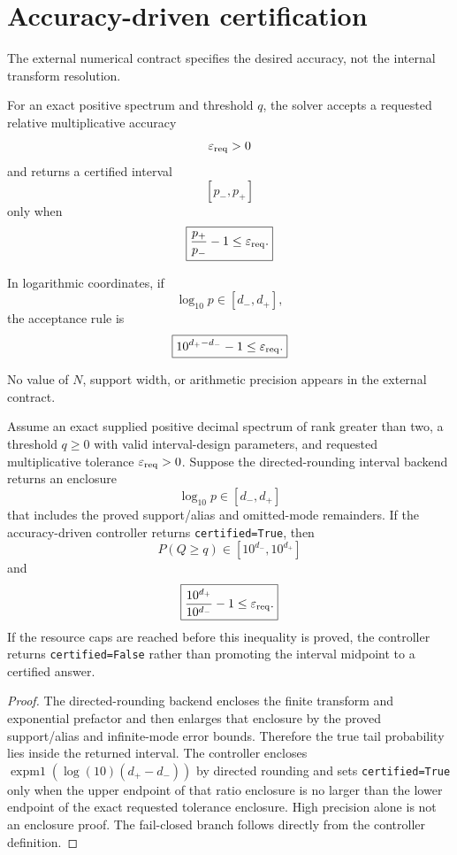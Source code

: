 \chapter{Accuracy-driven certification}\label{ch:accuracy}
\label{sec:final-5}

The external numerical contract specifies the desired accuracy, not the
internal transform resolution.

For an exact positive spectrum and threshold \(q\), the solver accepts a
requested relative multiplicative accuracy
\[
\varepsilon_{\rm req}>0
\]
and returns a certified interval
\[
[p_-,p_+]
\]
only when
\[
\boxed{
\frac{p_+}{p_-}-1
\le
\varepsilon_{\rm req}.
}
\]

In logarithmic coordinates, if
\[
\log_{10}p\in[d_-,d_+],
\]
the acceptance rule is
\[
\boxed{
10^{d_+-d_-}-1
\le
\varepsilon_{\rm req}.
}
\]

No value of \(N\), support width, or arithmetic precision appears in the
external contract.

\begin{theorem}\label{claim:final-5-1}
Assume an exact supplied positive decimal spectrum of rank greater than two,
a threshold \(q\ge0\) with valid interval-design parameters, and requested multiplicative tolerance
\(\varepsilon_{\rm req}>0\).  Suppose the directed-rounding interval backend
returns an enclosure
\[
\log_{10}p\in[d_-,d_+]
\]
that includes the proved support/alias and omitted-mode remainders.  If the
accuracy-driven controller returns \texttt{certified=True}, then
\[
\boxed{
P(Q\ge q)\in[10^{d_-},10^{d_+}]
}
\]
and
\[
\boxed{
\frac{10^{d_+}}{10^{d_-}}-1
\le
\varepsilon_{\rm req}.
}
\]
If the resource caps are reached before this inequality is proved, the
controller returns \texttt{certified=False} rather than promoting the interval
midpoint to a certified answer.
\end{theorem}

\begin{proof}
The directed-rounding backend encloses the finite transform and exponential
prefactor and then enlarges that enclosure by the proved support/alias and
infinite-mode error bounds.  Therefore the true tail probability lies inside
the returned interval.  The controller encloses
\(\operatorname{expm1}(\log(10)(d_+-d_-))\) by directed rounding and
sets \texttt{certified=True} only when the upper endpoint of that ratio
enclosure is no larger than the lower endpoint of the exact requested
tolerance enclosure.  High precision alone is not an enclosure proof.  The fail-closed branch follows directly from
the controller definition.
\end{proof}

